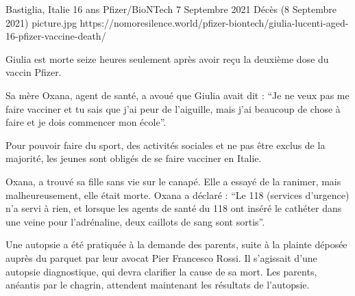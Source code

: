 {Bastiglia, Italie}
{16 ans}
{Pfizer/BioNTech}
{7 Septembre 2021}
{Décès (8 Septembre 2021)}
{picture.jpg}
{https://nomoresilence.world/pfizer-biontech/giulia-lucenti-aged-16-pfizer-vaccine-death/}
{

Giulia est morte seize heures seulement après avoir reçu la deuxième dose du
vaccin Pfizer.

Sa mère Oxana, agent de santé, a avoué que Giulia avait dit : “Je ne veux pas me
faire vacciner et tu sais que j'ai peur de l'aiguille, mais j'ai beaucoup de
chose à faire et je dois commencer mon école”.

Pour pouvoir faire du sport, des activités sociales et ne pas être exclus de la
majorité, les jeunes sont obligés de se faire vacciner en Italie.

Oxana, a trouvé sa fille sans vie sur le canapé. Elle a essayé de la ranimer,
mais malheureusement, elle était morte. Oxana a déclaré : “Le 118 (services
d'urgence) n'a servi à rien, et lorsque les agents de santé du 118 ont inséré le
cathéter dans une veine pour l'adrénaline, deux caillots de sang sont sortis”.

Une autopsie a été pratiquée à la demande des parents, suite à la plainte
déposée auprès du parquet par leur avocat Pier Francesco Rossi. Il s'agissait
d'une autopsie diagnostique, qui devra clarifier la cause de sa mort. Les
parents, anéantis par le chagrin, attendent maintenant les résultats de
l'autopsie.

}
